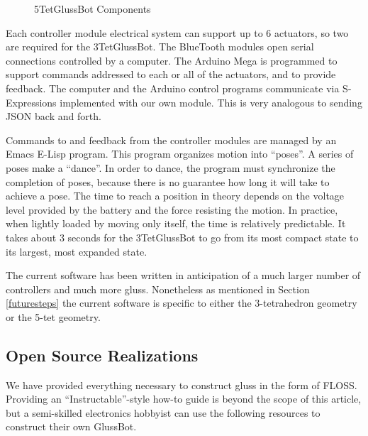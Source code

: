 \documentclass[11pt]{article}
\begin{document}
\begin{figure}[!ht]
  \centering
    \caption[5TetGlussBot Components]{5TetGlussBot Components}
      \label{5TetGlussBot}
\end{figure}


Each controller module electrical system can support up to 6 actuators, so two are required for the 3TetGlussBot.
The BlueTooth modules open serial connections controlled by a computer.
The Arduino Mega is programmed to support commands addressed to each or all of the actuators, and
to provide feedback. The computer and the Arduino control programs communicate via S-Expressions
implemented with our own module. This is very analogous to sending JSON back and forth.

Commands to and feedback from the controller modules are managed by an Emacs E-Lisp program.
This program organizes motion into ``poses''. A series of poses make a ``dance''.
In order to dance, the program must synchronize the completion of poses, because there is no
guarantee how long it will take to achieve a pose. The time to reach a position in theory
depends on the voltage level provided by the battery and the force resisting the motion.
In practice, when lightly loaded by moving only itself, the time is relatively predictable. It takes
about 3 seconds for the 3TetGlussBot to go from its most compact state to its largest, most expanded state.

The current software has been written in anticipation of a much larger number of controllers and much more gluss.
Nonetheless as mentioned in Section \ref{futuresteps} the current software is specific to either the 3-tetrahedron geometry or the
5-tet geometry.


\subsection{Open Source Realizations}

We have provided everything necessary to construct gluss in the form of FLOSS. Providing an ``Instructable''-style
how-to guide is beyond the scope of this article, but a semi-skilled electronics hobbyist can use the
following resources to construct their own GlussBot.
\end{document}
